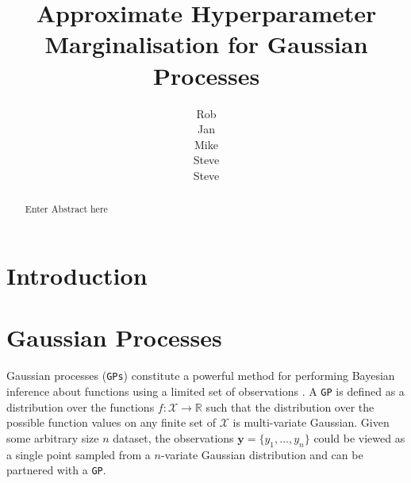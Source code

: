 \documentclass{article}
\title{Approximate Hyperparameter Marginalisation for Gaussian Processes}
\author{
Rob\\
\And
Jan\\
\And
Mike\\
\And
Steve\\
\And
Steve\\}
\begin{document}
\maketitle

\begin{abstract}
Enter Abstract here
\end{abstract}


\section{Introduction}



\section{Gaussian Processes}

Gaussian processes (\verb"GPs") constitute a powerful method for performing Bayesian inference about functions using a limited set of observations \cite{rassandwill}. A \verb"GP" is defined as a distribution over the functions $f : \mathcal{X} \rightarrow \mathbb{R}$ such that the distribution over the possible function values on any finite set of $\mathcal{X}$ is multi-variate Gaussian. Given some arbitrary size $n$ dataset, the observations $\mathbf{y} = \{ y_1,...,y_n\}$ could be viewed as a single point sampled from a $n$-variate Gaussian distribution and can be partnered with a \verb"GP".
\end{document}
